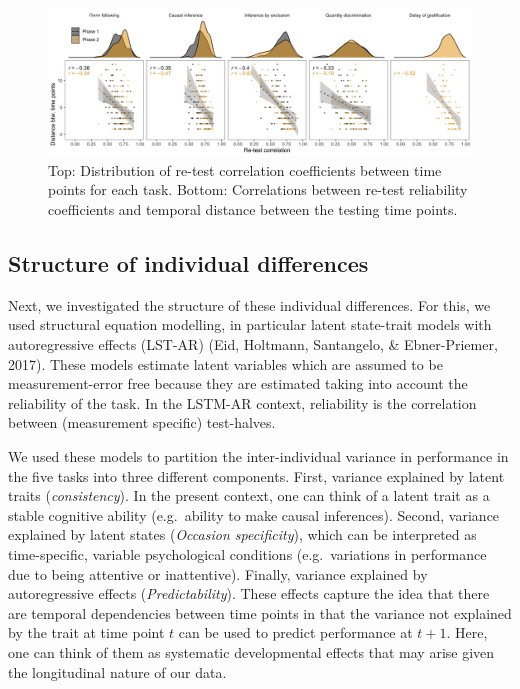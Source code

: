 \documentclass[
  man,floatsintext]{apa6}
\begin{document}
\begin{figure}
\includegraphics[width=1\linewidth]{./figures/reliability} \caption{Top: Distribution of re-test correlation coefficients between time points for each task. Bottom: Correlations between re-test reliability coefficients and temporal distance between the testing time points.}\label{fig:relplot}
\end{figure}

\hypertarget{structure-of-individual-differences}{%
\subsection{Structure of individual differences}\label{structure-of-individual-differences}}

Next, we investigated the structure of these individual differences. For this, we used structural equation modelling, in particular latent state-trait models with autoregressive effects (LST-AR) (Eid, Holtmann, Santangelo, \& Ebner-Priemer, 2017). These models estimate latent variables which are assumed to be measurement-error free because they are estimated taking into account the reliability of the task. In the LSTM-AR context, reliability is the correlation between (measurement specific) test-halves.

We used these models to partition the inter-individual variance in performance in the five tasks into three different components. First, variance explained by latent traits (\emph{consistency}). In the present context, one can think of a latent trait as a stable cognitive ability (e.g.~ability to make causal inferences). Second, variance explained by latent states (\emph{Occasion specificity}), which can be interpreted as time-specific, variable psychological conditions (e.g.~variations in performance due to being attentive or inattentive). Finally, variance explained by autoregressive effects (\emph{Predictability}). These effects capture the idea that there are temporal dependencies between time points in that the variance not explained by the trait at time point \(t\) can be used to predict performance at \(t+1\). Here, one can think of them as systematic developmental effects that may arise given the longitudinal nature of our data.
\end{document}
